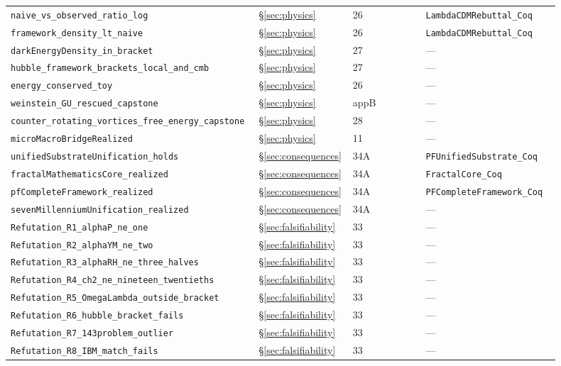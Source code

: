 \documentclass[11pt,a4paper]{article}
\theoremstyle{definition}
\theoremstyle{remark}
\newcommand{\lean}[1]{\texttt{\small #1}}
\begin{document}
\begin{longtable}{p{0.40\linewidth} p{0.13\linewidth} p{0.13\linewidth} p{0.24\linewidth}}
\lean{naive\_vs\_observed\_ratio\_log} & \S\ref{sec:physics} & 26 & \lean{LambdaCDMRebuttal\_Coq} \\
\lean{framework\_density\_lt\_naive} & \S\ref{sec:physics} & 26 & \lean{LambdaCDMRebuttal\_Coq} \\
\lean{darkEnergyDensity\_in\_bracket} & \S\ref{sec:physics} & 27 & --- \\
\lean{hubble\_framework\_brackets\_local\_and\_cmb} & \S\ref{sec:physics} & 27 & --- \\
\lean{energy\_conserved\_toy} & \S\ref{sec:physics} & 26 & --- \\
\lean{weinstein\_GU\_rescued\_capstone} & \S\ref{sec:physics} & appB & --- \\
\lean{counter\_rotating\_vortices\_free\_energy\_capstone} & \S\ref{sec:physics} & 28 & --- \\
\lean{microMacroBridgeRealized} & \S\ref{sec:physics} & 11 & --- \\
\lean{unifiedSubstrateUnification\_holds} & \S\ref{sec:consequences} & 34A & \lean{PFUnifiedSubstrate\_Coq} \\
\lean{fractalMathematicsCore\_realized} & \S\ref{sec:consequences} & 34A & \lean{FractalCore\_Coq} \\
\lean{pfCompleteFramework\_realized} & \S\ref{sec:consequences} & 34A & \lean{PFCompleteFramework\_Coq} \\
\lean{sevenMillenniumUnification\_realized} & \S\ref{sec:consequences} & 34A & --- \\
\lean{Refutation\_R1\_alphaP\_ne\_one} & \S\ref{sec:falsifiability} & 33 & --- \\
\lean{Refutation\_R2\_alphaYM\_ne\_two} & \S\ref{sec:falsifiability} & 33 & --- \\
\lean{Refutation\_R3\_alphaRH\_ne\_three\_halves} & \S\ref{sec:falsifiability} & 33 & --- \\
\lean{Refutation\_R4\_ch2\_ne\_nineteen\_twentieths} & \S\ref{sec:falsifiability} & 33 & --- \\
\lean{Refutation\_R5\_OmegaLambda\_outside\_bracket} & \S\ref{sec:falsifiability} & 33 & --- \\
\lean{Refutation\_R6\_hubble\_bracket\_fails} & \S\ref{sec:falsifiability} & 33 & --- \\
\lean{Refutation\_R7\_143problem\_outlier} & \S\ref{sec:falsifiability} & 33 & --- \\
\lean{Refutation\_R8\_IBM\_match\_fails} & \S\ref{sec:falsifiability} & 33 & --- \\
\bottomrule
\end{longtable}
\end{document}
